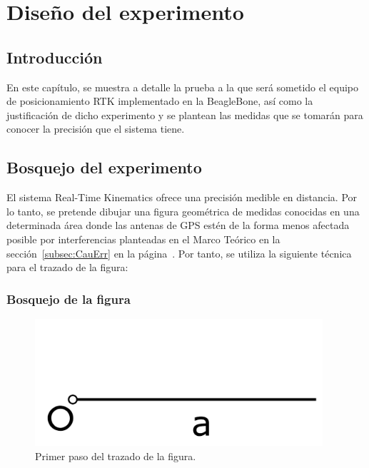 
\chapter{Diseño del experimento}
\label{Chap:DisExp} %


\section{Introducción}

En este capítulo, se muestra a detalle la prueba a la que será sometido el equipo de posicionamiento RTK implementado en la BeagleBone, así como la justificación de dicho experimento y se plantean las medidas que se tomarán para conocer la precisión que el sistema tiene.

\section{Bosquejo del experimento}

El sistema Real-Time Kinematics ofrece una precisión medible en distancia. Por lo tanto, se pretende dibujar una figura geométrica de medidas conocidas en una determinada área donde las antenas de GPS estén de la forma menos afectada posible por interferencias planteadas en el Marco Teórico en la sección~\ref{subsec:CauErr} en la página~\pageref{subsec:CauErr}. Por tanto, se utiliza la siguiente técnica para el trazado de la figura:

\subsection{Bosquejo de la figura}

\begin{figure}[H]
\centering
\includegraphics[width=0.95\textwidth]{Figures/Cuad1}
\caption[Primer paso del trazado de la figura.]{Primer paso del trazado de la figura.}
\label{fig:TrazFig1}
\end{figure}


